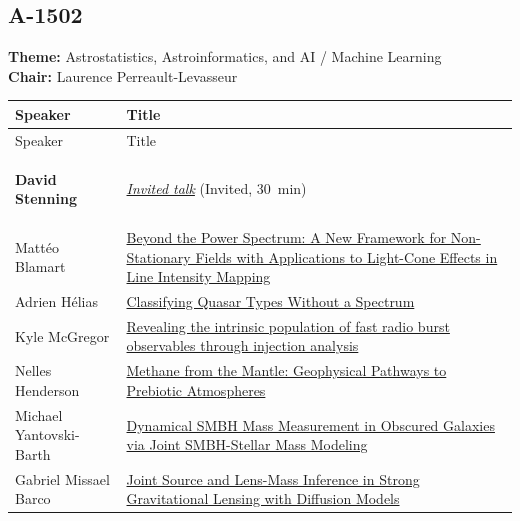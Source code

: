 \subsection*{A-1502}
\textbf{Theme:} Astrostatistics, Astroinformatics, and AI / Machine Learning\\
\textbf{Chair:} Laurence Perreault-Levasseur\\
{\small
{}
\sloppy
\setlength{\emergencystretch}{1em}
\begin{longtable}{@{}>{\TableRaggedRight\arraybackslash\hspace{0pt}}p{} >{\TableRaggedRight\arraybackslash\hspace{0pt}}p{}@{}}
\toprule
Speaker & Title \\
\midrule
\endfirsthead
\toprule
Speaker & Title \\
\midrule
\endhead
\hypertarget{invited-david-stenning-sched}{}\label{invited-page-david-stenning-sched}{\bfseries\color{cascagold}David Stenning} & \hyperlink{invited-david-stenning}{\emph{Invited talk}} {\small\color{cascagold}(Invited, 30~min)} \\
\hypertarget{schedule-talk-251}{}\label{schedule-page-talk-251}Mattéo Blamart & \hyperlink{abstract-talk-251}{Beyond the Power Spectrum: A New Framework for Non-Stationary Fields with Applications to Light-Cone Effects in Line Intensity Mapping} \\
\hypertarget{schedule-talk-193}{}\label{schedule-page-talk-193}Adrien Hélias & \hyperlink{abstract-talk-193}{Classifying Quasar Types Without a Spectrum} \\
\hypertarget{schedule-talk-227}{}\label{schedule-page-talk-227}Kyle McGregor & \hyperlink{abstract-talk-227}{Revealing the intrinsic population of fast radio burst observables through injection analysis} \\
\hypertarget{schedule-talk-68}{}\label{schedule-page-talk-68}Nelles Henderson & \hyperlink{abstract-talk-68}{Methane from the Mantle: Geophysical Pathways to Prebiotic Atmospheres} \\
\hypertarget{schedule-talk-330}{}\label{schedule-page-talk-330}Michael Yantovski-Barth & \hyperlink{abstract-talk-330}{Dynamical SMBH Mass Measurement in Obscured Galaxies via Joint SMBH-Stellar Mass Modeling} \\
\hypertarget{schedule-talk-317}{}\label{schedule-page-talk-317}Gabriel Missael Barco & \hyperlink{abstract-talk-317}{Joint Source and Lens-Mass Inference in Strong Gravitational Lensing with Diffusion Models} \\

\end{longtable}}
